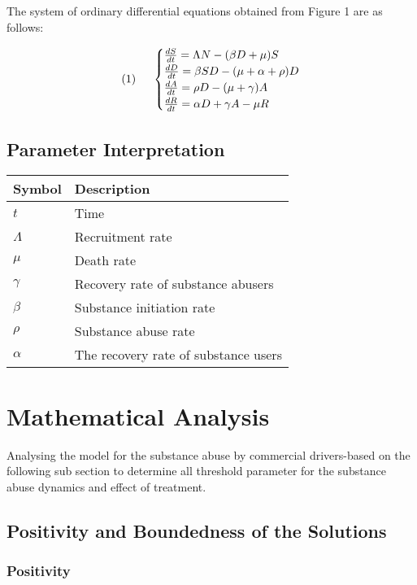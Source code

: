 \documentclass[12pt]{report}
\begin{document}
The system of ordinary differential equations obtained from Figure 1 are as follows:

\[	\quad (1)\hspace{0.5cm}
\begin{cases}
	
	\frac{dS}{dt} = \Lambda N - (\beta D + \mu)S \\
	\frac{dD}{dt} = \beta SD - (\mu + \alpha + \rho)D \\
	\frac{dA}{dt} = \rho D - (\mu + \gamma)A \\
	\frac{dR}{dt} = \alpha D + \gamma A - \mu R
\end{cases}\]
\subsection{Parameter Interpretation}

\begin{center}
	\begin{tabular}{|l|l|}
		\hline
		\textbf{Symbol} & \textbf{Description} \\
		
		\hline$t$ & Time \\
		\hline$\Lambda$ & Recruitment rate \\
	\hline	$\mu$ & Death  rate \\
	\hline	$\gamma$ & Recovery rate of substance abusers \\
	\hline	$\beta$ & Substance initiation rate \\
	\hline	$\rho$ & Substance abuse rate \\
	\hline	$\alpha$ & The recovery rate of substance users \\
		\hline
	\end{tabular}
\end{center}

\section{Mathematical Analysis}
Analysing the model for the substance abuse by commercial drivers-based on the following sub section to determine all threshold parameter for the substance abuse  dynamics and effect of treatment. 
\subsection{Positivity and Boundedness of the Solutions}

\subsubsection{Positivity}
\end{document}
